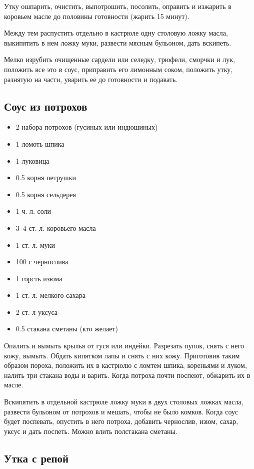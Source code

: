 Утку ошпарить, очистить, выпотрошить, посолить, оправить и изжарить в коровьем масле до половины готовности (жарить 15 минут).

Между тем распустить отдельно в кастрюле одну столовую ложку масла, выкипятить в нем ложку муки, развести мясным бульоном, дать вскипеть.

Мелко изрубить очищенные сардели или селедку, трюфели, сморчки и лук, положить все это в соус, приправить его лимонным соком, положить утку, разнятую на части, уварить ее до готовности и подавать.

\subsection{Соус из потрохов}

\begin{itemize}
	\item 2 набора потрохов (гусиных или индюшиных) 
    \item 1 ломоть шпика 
    \item 1 луковица
    \item 0.5 корня петрушки
    \item 0.5 корня сельдерея
    \item 1 ч. л. соли 
    \item 3–4 ст. л. коровьего масла
    \item 1 ст. л. муки 
    \item 100 г чернослива 
    \item 1 горсть изюма
    \item 1 ст. л. мелкого сахара 
    \item 2 ст. л уксуса 
    \item 0.5 стакана сметаны (кто желает)
\end{itemize}

Опалить и вымыть крылья от гуся или индейки. Разрезать пупок, снять с него кожу, вымыть. Обдать кипятком лапы и снять с них кожу. Приготовив таким образом пороха, положить их в кастрюлю с ломтем шпика, кореньями и луком, налить три стакана воды и варить. Когда потроха почти поспеют, обжарить их в масле.

Вскипятить в отдельной кастрюле ложку муки в двух столовых ложках масла, развести бульоном от потрохов и мешать, чтобы не было комков. Когда соус будет поспевать, опустить в него потроха, добавить чернослив, изюм, сахар, уксус и дать поспеть. Можно влить полстакана сметаны.

\subsection{Утка с репой}

